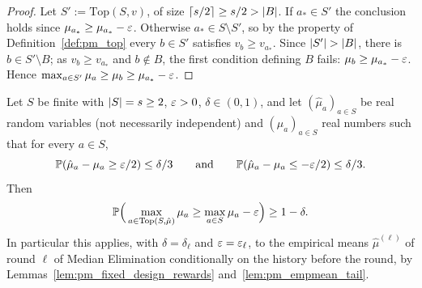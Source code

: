 \begin{proof}
\leanok
{}
Let $S' := \mathrm{Top}(S,v)$, of size $\lceil s/2\rceil\ge s/2>\lvert B \rvert$. If $a_*\in S'$ the
conclusion holds since $\mu_{a_*}\ge\mu_{a_*}-\varepsilon$. Otherwise $a_*\in S\setminus S'$, so by the
property of Definition~\ref{def:pm_top} every $b\in S'$ satisfies $v_b\ge v_{a_*}$. Since
$\lvert S' \rvert>\lvert B \rvert$, there is $b\in S'\setminus B$; as $v_b\ge v_{a_*}$ and $b\notin B$, the first
condition defining $B$ fails: $\mu_b\ge\mu_{a_*}-\varepsilon$. Hence $\max_{a\in S'}\mu_a\ge\mu_b\ge\mu_{a_*}-\varepsilon$.
\end{proof}

\begin{lemma}\label{lem:me_round}
\leanok
{}
Let $S$ be finite with $\lvert S \rvert = s\ge2$, $\varepsilon>0$, $\delta\in(0,1)$, and let $(\hat\mu_a)_{a\in S}$
be real random variables (not necessarily independent) and $(\mu_a)_{a\in S}$ real numbers such
that for every $a\in S$,
\[
  \mathbb{P}(\hat\mu_a-\mu_a\ge\varepsilon/2)\le\delta/3\qquad\text{and}\qquad\mathbb{P}(\hat\mu_a-\mu_a\le-\varepsilon/2)\le\delta/3 .
\]
Then
\[
  \mathbb{P}\Big(\max_{a\in\mathrm{Top}(S,\hat\mu)}\mu_a\ge\max_{a\in S}\mu_a-\varepsilon\Big)\ge1-\delta .
\]
In particular this applies, with $\delta = \delta_\ell$ and $\varepsilon = \varepsilon_\ell$, to the empirical
means $\hat\mu^{(\ell)}$ of round $\ell$ of Median Elimination conditionally on the history
before the round, by Lemmas~\ref{lem:pm_fixed_design_rewards} and~\ref{lem:pm_empmean_tail}.
\end{lemma}

